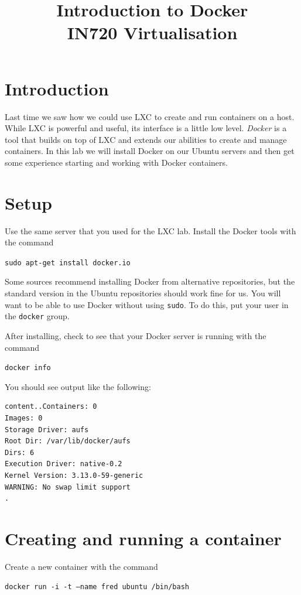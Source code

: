 \documentclass{article}
\begin{document}
\title{Introduction to Docker\\ IN720 Virtualisation}
\date{}
\maketitle

\section*{Introduction}
Last time we saw how we could use LXC to create and run containers on a host. While LXC is powerful and useful, its interface is a little low level. \emph{Docker} is a tool that builds on top of LXC and extends our abilities to create and manage containers.  In this lab we will install Docker on our Ubuntu servers and then get some experience starting and working with Docker containers.

\section{Setup}
Use the same server that you used for the LXC lab.  Install the Docker tools with the command

\texttt{sudo apt-get install docker.io}

Some sources recommend installing Docker from alternative repositories, but the standard version in the Ubuntu repositories should work fine for us. You will want to be able to use Docker without using \texttt{sudo}.  To do this, put your user in the \texttt{docker} group.

After installing, check to see that your Docker server is running with the command 

\texttt{docker info}

You should see output like the following:

\begin{verbatim}
content..Containers: 0
Images: 0
Storage Driver: aufs
Root Dir: /var/lib/docker/aufs
Dirs: 6
Execution Driver: native-0.2
Kernel Version: 3.13.0-59-generic
WARNING: No swap limit support
.
\end{verbatim}

\section{Creating and running a container}

Create a new container with the command

\texttt{docker run -i -t --name fred ubuntu /bin/bash}
\end{document}
